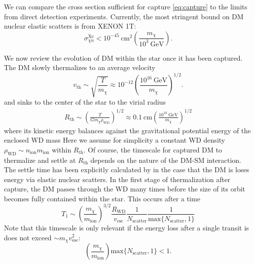 \documentclass[preprintnumbers,amsmath,amssymb,prd,superscriptaddress]{revtex4}
\newcommand{\GeV}{\text{GeV}}
\newcommand{\cm}{\text{cm}}
\def\r{\right)}
\def\l{\left(}
\begin{document}
We can compare the cross section sufficient for capture \eqref{eq:capture} to the limits from direct detection experiments.
Currently, the most stringent bound on DM nuclear elastic scatters is from XENON 1T:
\begin{equation}
\label{eq:xenon}
\sigma^\text{Xe}_{\chi n} < 10^{-45} ~\text{cm}^2 \l \frac{m_\chi}{10^3 ~\GeV} \r.
\end{equation}

We now review the evolution of DM within the star once it has been captured. 
The DM slowly thermalizes to an average velocity
\begin{equation}
v_\text{th} \sim \sqrt{\frac{T}{m_\chi}} \approx 10^{-12} \l \frac{10^{16} ~\GeV}{m_\chi}\r^{1/2}.
\end{equation}
and sinks to the center of the star to the virial radius
\begin{align}
R_\text{th} \sim \l \frac{T}{G m_\chi \rho_\text{WD}}\r^{1/2} \approx 0.1 ~\cm \l \frac{10^{16} ~\GeV}{m_\chi}\r^{1/2} 
\end{align}
where its kinetic energy balances against the gravitational potential energy of the enclosed WD mass
Here we assume for simplicity a constant WD density $\rho_\text{WD} \sim n_\text{ion} m_\text{ion}$ within $R_\text{th}$.
Of course, the timescale for captured DM to thermalize and settle at $R_\text{th}$ depends on the nature of the DM-SM interaction.
The settle time has been explicitly calculated by \cite{Tinyakov} in the case that the DM is loses energy via elastic nuclear scatters.
In the first stage of thermalization after capture, the DM passes through the WD many times before the size of its orbit becomes fully contained within the star.
This occurs after a time
\begin{equation}
T_1 \sim \l \frac{m_\chi}{m_\text{ion}} \r^{3/2} \frac{R_\text{WD}}{v_\text{esc}} \frac{1}{N_\text{scatter}} \frac{1}{\text{max}\{N_\text{scatter}, 1\}}
\end{equation}
Note that this timescale is only relevant if the energy loss after a single transit is does not exceed $\sim m_\chi v_\text{esc}^2$:
\begin{equation}
\l \frac{m_\chi}{m_\text{ion}} \r \text{max}\{N_\text{scatter},1\} < 1. 
\end{equation}
\end{document}
